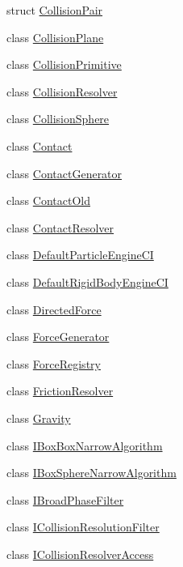 \begin{DoxyCompactItemize}
\item 
struct \mbox{\hyperlink{structr3_1_1_collision_pair}{Collision\+Pair}}
\item 
class \mbox{\hyperlink{classr3_1_1_collision_plane}{Collision\+Plane}}
\item 
class \mbox{\hyperlink{classr3_1_1_collision_primitive}{Collision\+Primitive}}
\item 
class \mbox{\hyperlink{classr3_1_1_collision_resolver}{Collision\+Resolver}}
\item 
class \mbox{\hyperlink{classr3_1_1_collision_sphere}{Collision\+Sphere}}
\item 
class \mbox{\hyperlink{classr3_1_1_contact}{Contact}}
\item 
class \mbox{\hyperlink{classr3_1_1_contact_generator}{Contact\+Generator}}
\item 
class \mbox{\hyperlink{classr3_1_1_contact_old}{Contact\+Old}}
\item 
class \mbox{\hyperlink{classr3_1_1_contact_resolver}{Contact\+Resolver}}
\item 
class \mbox{\hyperlink{classr3_1_1_default_particle_engine_c_i}{Default\+Particle\+Engine\+CI}}
\item 
class \mbox{\hyperlink{classr3_1_1_default_rigid_body_engine_c_i}{Default\+Rigid\+Body\+Engine\+CI}}
\item 
class \mbox{\hyperlink{classr3_1_1_directed_force}{Directed\+Force}}
\item 
class \mbox{\hyperlink{classr3_1_1_force_generator}{Force\+Generator}}
\item 
class \mbox{\hyperlink{classr3_1_1_force_registry}{Force\+Registry}}
\item 
class \mbox{\hyperlink{classr3_1_1_friction_resolver}{Friction\+Resolver}}
\item 
class \mbox{\hyperlink{classr3_1_1_gravity}{Gravity}}
\item 
class \mbox{\hyperlink{classr3_1_1_i_box_box_narrow_algorithm}{I\+Box\+Box\+Narrow\+Algorithm}}
\item 
class \mbox{\hyperlink{classr3_1_1_i_box_sphere_narrow_algorithm}{I\+Box\+Sphere\+Narrow\+Algorithm}}
\item 
class \mbox{\hyperlink{classr3_1_1_i_broad_phase_filter}{I\+Broad\+Phase\+Filter}}
\item 
class \mbox{\hyperlink{classr3_1_1_i_collision_resolution_filter}{I\+Collision\+Resolution\+Filter}}
\item 
class \mbox{\hyperlink{classr3_1_1_i_collision_resolver_access}{I\+Collision\+Resolver\+Access}}

\end{DoxyCompactItemize}
